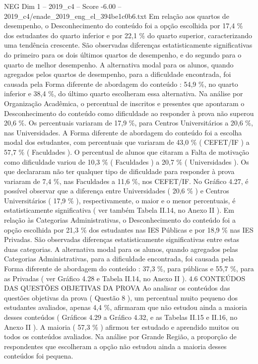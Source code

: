 \begin{textsample}{NEG Dim 1 – 2019\_c4 – Score -6.00 – 2019\_c4/enade\_2019\_eng\_el\_394be1c0b6.txt}
Em relação aos quartos de desempenho, o Desconhecimento do conteúdo foi a opção escolhida por 17,4 \% dos estudantes do quarto inferior e por 22,1 \% do quarto superior, caracterizando uma tendência crescente.
São observadas diferenças estatisticamente significativas do primeiro para os dois últimos quartos de desempenho, e do segundo para o quarto de melhor desempenho.
A alternativa modal para os alunos, quando agregados pelos quartos de desempenho, para a dificuldade encontrada, foi causada pela Forma diferente de abordagem do conteúdo : 54,9 \%, no quarto inferior e 38,4 \%, do último quarto escolheram essa alternativa.
Na análise por Organização Acadêmica, o percentual de inscritos e presentes que apontaram o Desconhecimento do conteúdo como dificuldade ao responder à prova não superou 20,6 \%.
Os percentuais variaram de 17,9 \%, para Centros Universitários a 20,6 \%, nas Universidades.
A Forma diferente de abordagem do conteúdo foi a escolha modal dos estudantes, com percentuais que variaram de 43,0 \% ( CEFET/IF ) a 57,7 \% ( Faculdades ).
O percentual de alunos que citaram a Falta de motivação como dificuldade variou de 10,3 \% ( Faculdades ) a 20,7 \% ( Universidades ).
Os que declararam não ter qualquer tipo de dificuldade para responder à prova variaram de 7,4 \%, nas Faculdades a 11,6 \%, nos CEFET/IF.
No Gráfico 4.27, é possível observar que a diferença entre Universidades ( 20,6 \% ) e Centros Universitários ( 17,9 \% ), respectivamente, o maior e o menor percentuais, é estatisticamente significativa ( ver também Tabela II.14, no Anexo II ).
Em relação às Categorias Administrativas, o Desconhecimento do conteúdo foi a opção escolhida por 21,3 \% dos estudantes nas IES Públicas e por 18,9 \% nas IES Privadas.
São observadas diferenças estatisticamente significativas entre estas duas categorias.
A alternativa modal para os alunos, quando agregados pelas Categorias Administrativas, para a dificuldade encontrada, foi causada pela Forma diferente de abordagem do conteúdo : 37,3 \%, para públicas e 55,7 \%, para as Privadas ( ver Gráfico 4.28 e Tabela II.14, no Anexo II ). 4.6 CONTEÚDOS DAS QUESTÕES OBJETIVAS DA PROVA Ao analisar os conteúdos das questões objetivas da prova ( Questão 8 ), um percentual muito pequeno dos estudantes avaliados, apenas 4,4 \%, afirmaram que não estudou ainda a maioria desses conteúdos ( Gráficos 4.29 a Gráfico 4.32, e as Tabelas II.15 e II.16, no Anexo II ).
A maioria ( 57,3 \% ) afirmou ter estudado e aprendido muitos ou todos os conteúdos avaliados.
Na análise por Grande Região, a proporção de respondentes que escolheram a opção não estudou ainda a maioria desses conteúdos foi pequena.

\end{textsample}
